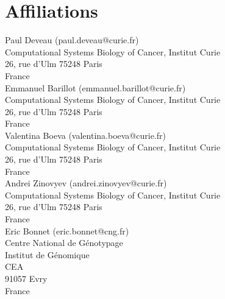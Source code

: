 \documentclass{article}
\begin{document}
\section{Affiliations}

Paul Deveau (paul.deveau@curie.fr)\\
  Computational Systems Biology of Cancer, Institut Curie\\
  26, rue d'Ulm 75248 Paris\\
  France\\

\noindent
Emmanuel Barillot (emmanuel.barillot@curie.fr)\\
  Computational Systems Biology of Cancer, Institut Curie\\
  26, rue d'Ulm 75248 Paris\\
  France\\

\noindent
Valentina Boeva (valentina.boeva@curie.fr)\\
  Computational Systems Biology of Cancer, Institut Curie\\
  26, rue d'Ulm 75248 Paris\\
  France\\

\noindent
Andrei Zinovyev (andrei.zinovyev@curie.fr)\\
  Computational Systems Biology of Cancer, Institut Curie\\
  26, rue d'Ulm 75248 Paris\\
  France\\

\noindent
Eric Bonnet (eric.bonnet@cng.fr)\\
Centre National de Génotypage\\ 
Institut de Génomique\\
CEA\\
91057 Evry\\ 
France\\



\end{document}
